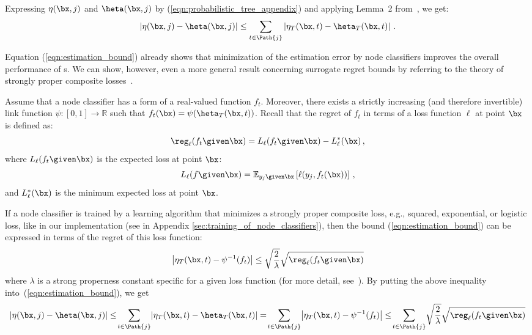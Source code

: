 Expressing $\eta(\bx, j)$  and $\heta(\bx, j)$ by (\ref{eqn:probabilistic_tree_appendix}) and applying Lemma~2 from~\cite{Beygelzimer_et_al_2009b}, we get:
\begin{equation}
\left | \eta(\bx, j) - \heta(\bx, j) \right | \le \sum_{t \in \Path{j}} \left | \eta_T(\bx, t) - \heta_T(\bx, t) \right | \,.
\label{eqn:estimation_bound}
\end{equation}

Equation (\ref{eqn:estimation_bound}) already shows that minimization of the estimation error by node classifiers improves the overall performance of s. We can show, however, even a more general result concerning surrogate regret bounds by referring to the theory of  strongly proper composite losses~\cite{Agarwal_2014}. 

Assume that a node classifier has a form of a real-valued function $f_t$. Moreover, there exists a strictly increasing (and therefore invertible) link function $\psi: [0,1] \rightarrow \mathbb{R}$ such that $f_t(\bx) = \psi(\heta_T(\bx,t))$. Recall that the regret of $f_t$ in terms of a loss function $\ell$ at point $\bx$ is defined as:
$$
\reg_{\ell}(f_t \given \bx) = L_{\ell}(f_t \given \bx) - L_{\ell}^*(\bx) \,,
$$
where $L_{\ell}(f_t \given \bx)$ is the expected loss  at  point $\bx$:
$$
L_{\ell}(f \given \bx) = \mathbb{E}_{y_j\given\bx} \left [ \ell  (y_j, f_t(\bx)) \right ] \,,
$$
and  $L_{\ell}^*(\bx)$ is the minimum expected loss at point $\bx$.

If a node classifier is trained by a learning algorithm that minimizes a strongly proper composite loss, e.g.,  squared, exponential, or logistic loss, like in our implementation (see in Appendix \ref{sec:training_of_node_classifiers}), then the bound (\ref{eqn:estimation_bound}) can be expressed in terms of the regret of this loss function: 
$$
\left | \eta_T(\bx, t) - \psi^{-1}(f_t)  \right | \le \sqrt{ \frac{2}{\lambda}} \sqrt{\reg_\ell(f_t \given \bx)}
$$
where $\lambda$ is a strong properness constant specific for a given loss function (for more detail, see~\cite{Agarwal_2014}). By putting the above inequality into~(\ref{eqn:estimation_bound}), we get
$$
\left | \eta(\bx, j) - \heta(\bx, j) \right | \le \! \sum_{t \in \Path{j}} \! \left | \eta_T(\bx, t) - \heta_T(\bx, t) \right | = \!  \sum_{t \in \Path{j}}  \! \left | \eta_T(\bx, t) - \psi^{-1}(f_t)  \right | \le  \! \sum_{t \in \Path{j}}  \! \sqrt{ \frac{2}{\lambda}} \sqrt{\reg_\ell(f_t \given \bx)}
$$ 


